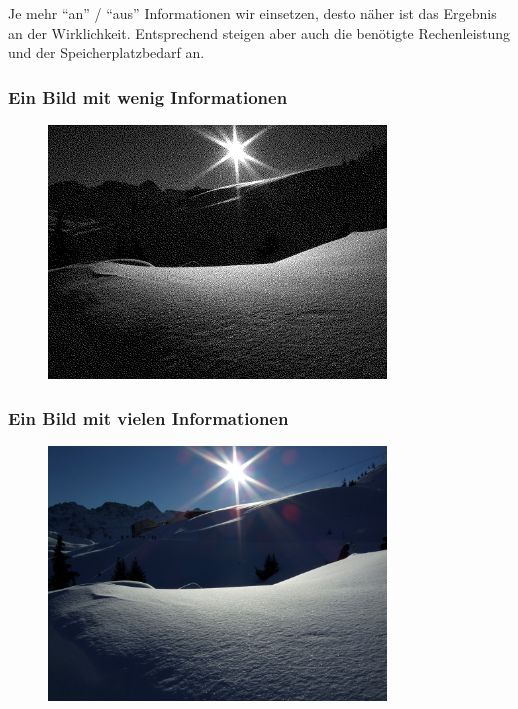   \begin{frame}
    Je mehr ``an'' / ``aus'' Informationen wir einsetzen, desto näher ist das Ergebnis an der Wirklichkeit. Entsprechend steigen aber auch die benötigte Rechenleistung und der Speicherplatzbedarf an. 
  \end{frame}

  \begin{frame}
  \frametitle{Ein Bild mit wenig Informationen}
    \begin{figure}
      \begin{center}  
        \includegraphics[width=0.8\textwidth]{pics/sw}
      \end{center}
    \end{figure}
  \end{frame}

  \begin{frame}
  \frametitle{Ein Bild mit vielen Informationen}
    \begin{figure}
      \begin{center}  
        \includegraphics[width=0.8\textwidth]{pics/farbe}
      \end{center}
    \end{figure}
  \end{frame}

